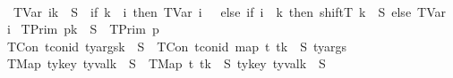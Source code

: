\begin{isabellebody}
\ \ \isanewline
\ \ {\isachardoublequoteopen}{\isacharparenleft}{\kern0pt}TVar\ i{\isacharparenright}{\kern0pt}{\isacharbrackleft}{\kern0pt}k\ {\isasymmapsto}\isactrlsub {\isasymtau}\ S{\isacharbrackright}{\kern0pt}\isactrlsub {\isasymtau}\ {\isacharequal}{\kern0pt}\ {\isacharparenleft}{\kern0pt}if\ k\ {\isacharless}{\kern0pt}\ i\ then\ TVar\ {\isacharparenleft}{\kern0pt}i\ {\isacharminus}{\kern0pt}\ {}{\isacharparenright}{\kern0pt}\ else\ if\ i\ {\isacharequal}{\kern0pt}\ k\ then\ shiftT\ k\ {}\ S\ else\ TVar\ i{\isacharparenright}{\kern0pt}{\isachardoublequoteclose}\isanewline
{\isacharbar}{\kern0pt}\ {\isachardoublequoteopen}{\isacharparenleft}{\kern0pt}TPrim\ p{\isacharparenright}{\kern0pt}{\isacharbrackleft}{\kern0pt}k\ {\isasymmapsto}\isactrlsub {\isasymtau}\ S{\isacharbrackright}{\kern0pt}\isactrlsub {\isasymtau}\ {\isacharequal}{\kern0pt}\ TPrim\ p{\isachardoublequoteclose}\isanewline
{\isacharbar}{\kern0pt}\ {\isachardoublequoteopen}{\isacharparenleft}{\kern0pt}TCon\ tcon{\isacharunderscore}{\kern0pt}id\ ty{\isacharunderscore}{\kern0pt}args{\isacharparenright}{\kern0pt}{\isacharbrackleft}{\kern0pt}k\ {\isasymmapsto}\isactrlsub {\isasymtau}\ S{\isacharbrackright}{\kern0pt}\isactrlsub {\isasymtau}\ {\isacharequal}{\kern0pt}\ TCon\ tcon{\isacharunderscore}{\kern0pt}id\ {\isacharparenleft}{\kern0pt}map\ {\isacharparenleft}{\kern0pt}{\isasymlambda}t{\isachardot}{\kern0pt}\ t{\isacharbrackleft}{\kern0pt}k\ {\isasymmapsto}\isactrlsub {\isasymtau}\ S{\isacharbrackright}{\kern0pt}\isactrlsub {\isasymtau}{\isacharparenright}{\kern0pt}\ ty{\isacharunderscore}{\kern0pt}args{\isacharparenright}{\kern0pt}{\isachardoublequoteclose}\isanewline
{\isacharbar}{\kern0pt}\ {\isachardoublequoteopen}{\isacharparenleft}{\kern0pt}TMap\ ty{\isacharunderscore}{\kern0pt}key\ ty{\isacharunderscore}{\kern0pt}val{\isacharparenright}{\kern0pt}{\isacharbrackleft}{\kern0pt}k\ {\isasymmapsto}\isactrlsub {\isasymtau}\ S{\isacharbrackright}{\kern0pt}\isactrlsub {\isasymtau}\ {\isacharequal}{\kern0pt}\ {\isacharparenleft}{\kern0pt}TMap\ {\isacharparenleft}{\kern0pt}{\isacharparenleft}{\kern0pt}{\isasymlambda}t{\isachardot}{\kern0pt}\ t{\isacharbrackleft}{\kern0pt}k\ {\isasymmapsto}\isactrlsub {\isasymtau}\ S{\isacharbrackright}{\kern0pt}\isactrlsub {\isasymtau}{\isacharparenright}{\kern0pt}\ ty{\isacharunderscore}{\kern0pt}key{\isacharparenright}{\kern0pt}\ {\isacharparenleft}{\kern0pt}ty{\isacharunderscore}{\kern0pt}val{\isacharbrackleft}{\kern0pt}k\ {\isasymmapsto}\isactrlsub {\isasymtau}\ S{\isacharbrackright}{\kern0pt}\isactrlsub {\isasymtau}{\isacharparenright}{\kern0pt}{\isacharparenright}{\kern0pt}{\isachardoublequoteclose}%

\end{isabellebody}
